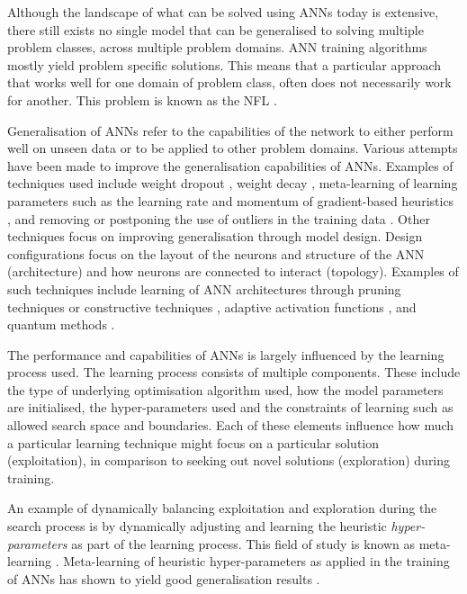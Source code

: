 Although the landscape of what can be solved using \acp{ANN} today
is extensive, there still exists no single model that can be generalised to
solving multiple problem classes, across multiple problem domains. \acs{ANN} training algorithms mostly yield problem specific solutions. This means that a particular approach that works well for one domain of problem class, often does not necessarily work for another. This problem is known as the \ac{NFL} \cite{ref:wolpert:1997}.

Generalisation of \acp{ANN} refer to the capabilities of the network to either perform well on unseen data or to be applied to other problem domains. Various attempts have been made to improve the generalisation capabilities of
\acp{ANN}. Examples of techniques used include weight dropout
\cite{ref:srivastava:2014}, weight decay
\cite{ref:krogh:1992}, meta-learning of learning parameters
such as the learning rate and momentum of
gradient-based heuristics \cite{ref:zeiler:2012, ref:lv:2017, ref:darken:1992},
and removing or postponing the use of outliers in the training data \cite{ref:reeves:1998}. Other techniques focus on improving
generalisation through model design. Design configurations focus on the layout of the neurons and structure of the \acs{ANN} (architecture) and how neurons are connected to interact (topology). Examples of such
techniques include learning of \ac{ANN} architectures through pruning techniques
\cite{ref:cibas:1996, ref:engelbrecht:1996} or constructive techniques
\cite{ref:hassibi:1994, ref:lecun:1990}, adaptive activation functions
\cite{ref:engelbrecht:1995, ref:fletcher:1994}, and quantum methods
\cite{ref:wan:2017, ref:ricks:2004}.

The performance and capabilities of \acp{ANN} is largely influenced by the learning process used. The learning process consists of multiple components. These include the type of underlying optimisation algorithm used, how the model parameters are initialised, the hyper-parameters used and the constraints of learning such as allowed search space and boundaries. Each of these elements influence how much a particular learning technique might focus on a particular solution (exploitation), in comparison to seeking out novel solutions (exploration) during training.

An example of dynamically balancing exploitation and exploration during the
search process is by dynamically adjusting and learning the heuristic
\textit{hyper-parameters} as part of the learning
process. This field of study is known as meta-learning
\cite{ref:giraud:2004}. Meta-learning of heuristic
hyper-parameters as applied in the training of \acp{ANN} has shown to yield good
generalisation results \cite{ref:hospedales:2020, ref:vilalta:2002}.

